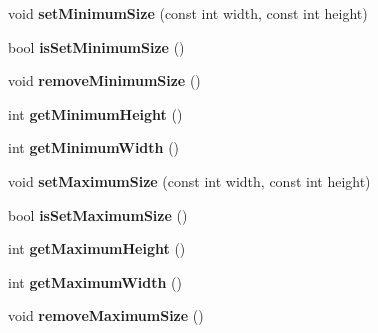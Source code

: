 \begin{DoxyCompactItemize}
\item 
\hypertarget{class_borderless_window_affe259e694c4902b865bd870717b011f}{}void {\bfseries set\+Minimum\+Size} (const int width, const int height)\label{class_borderless_window_affe259e694c4902b865bd870717b011f}

\item 
\hypertarget{class_borderless_window_ac1e19fc77aecf90753007dc66d30ba17}{}bool {\bfseries is\+Set\+Minimum\+Size} ()\label{class_borderless_window_ac1e19fc77aecf90753007dc66d30ba17}

\item 
\hypertarget{class_borderless_window_a6b5a511eb999d36af1de0560c382af75}{}void {\bfseries remove\+Minimum\+Size} ()\label{class_borderless_window_a6b5a511eb999d36af1de0560c382af75}

\item 
\hypertarget{class_borderless_window_a35124db0bd716a0827f559910c4266ac}{}int {\bfseries get\+Minimum\+Height} ()\label{class_borderless_window_a35124db0bd716a0827f559910c4266ac}

\item 
\hypertarget{class_borderless_window_a312228a6ce5d03bdf92394419c6c5c87}{}int {\bfseries get\+Minimum\+Width} ()\label{class_borderless_window_a312228a6ce5d03bdf92394419c6c5c87}

\item 
\hypertarget{class_borderless_window_a3b01e9234bb669a00dbffe057e1b5fd1}{}void {\bfseries set\+Maximum\+Size} (const int width, const int height)\label{class_borderless_window_a3b01e9234bb669a00dbffe057e1b5fd1}

\item 
\hypertarget{class_borderless_window_aa3817bf4497fdc24729a46229ecd48b1}{}bool {\bfseries is\+Set\+Maximum\+Size} ()\label{class_borderless_window_aa3817bf4497fdc24729a46229ecd48b1}

\item 
\hypertarget{class_borderless_window_afe12799d9dacc061b745c824138ad919}{}int {\bfseries get\+Maximum\+Height} ()\label{class_borderless_window_afe12799d9dacc061b745c824138ad919}

\item 
\hypertarget{class_borderless_window_a0eefb93fabc9fb41fbba27f6237823e0}{}int {\bfseries get\+Maximum\+Width} ()\label{class_borderless_window_a0eefb93fabc9fb41fbba27f6237823e0}

\item 
\hypertarget{class_borderless_window_aafccf70b3ca034a4474df9ca1d1a9b63}{}void {\bfseries remove\+Maximum\+Size} ()\label{class_borderless_window_aafccf70b3ca034a4474df9ca1d1a9b63}

\end{DoxyCompactItemize}
